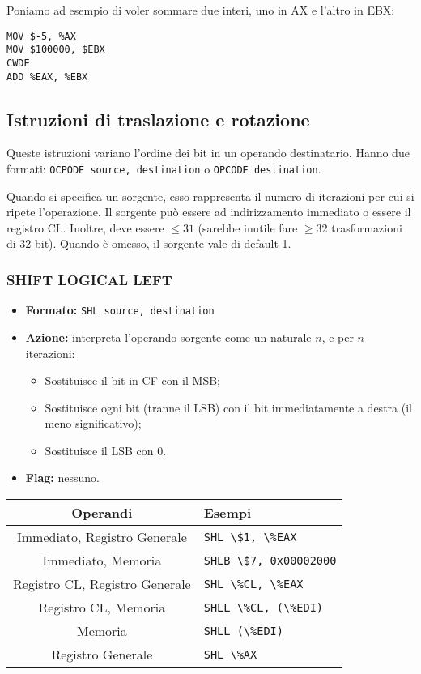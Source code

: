 \documentclass[a4paper,11pt]{article}
\begin{document}
Poniamo ad esempio di voler sommare due interi, uno in AX e l'altro in EBX:
\begin{lstlisting}[language=assembler,style=codestyle]	
MOV $-5, %AX
MOV $100000, $EBX
CWDE
ADD %EAX, %EBX
\end{lstlisting}

\subsection{Istruzioni di traslazione e rotazione}
Queste istruzioni variano l'ordine dei bit in un operando destinatario.
Hanno due formati: \lstinline|OCPODE source, destination| o \lstinline|OPCODE destination|.

Quando si specifica un sorgente, esso rappresenta il numero di iterazioni per cui si ripete l'operazione.
Il sorgente può essere ad indirizzamento immediato o essere il registro CL.
Inoltre, deve essere $\leq 31$ (sarebbe inutile fare $\geq32$ trasformazioni di 32 bit).
Quando è omesso, il sorgente vale di default 1.

\subsubsection{SHIFT LOGICAL LEFT}
\begin{itemize}
	\item \textbf{Formato:} \lstinline|SHL source, destination|
	\item \textbf{Azione:} interpreta l'operando sorgente come un naturale $n$, e per $n$ iterazioni:
		\begin{itemize}
			\item Sostituisce il bit in CF con il MSB;
			\item Sostituisce ogni bit (tranne il LSB) con il bit immediatamente a destra  (il meno significativo);
			\item Sostituisce il LSB con 0.
		\end{itemize}
	\item \textbf{Flag:} nessuno.
\end{itemize}

		\begin{table}[H]
		\center {}
			\begin{tabular} { c | p{5cm} }
				\bfseries Operandi & \bfseries Esempi \\
				\hline
				Immediato, Registro Generale & \lstinline|SHL \$1, \%EAX| \\
				Immediato, Memoria & \lstinline|SHLB \$7, 0x00002000| \\
				Registro CL, Registro Generale & \lstinline|SHL \%CL, \%EAX| \\
				Registro CL, Memoria & \lstinline|SHLL \%CL, (\%EDI)| \\
				Memoria & \lstinline|SHLL (\%EDI)| \\ 
				Registro Generale & \lstinline|SHL \%AX|
			\end{tabular}
		\end{table}
\end{document}
